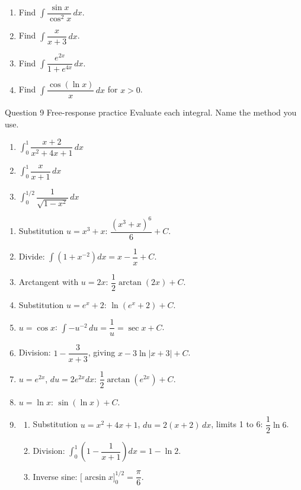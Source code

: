 \documentclass[11pt]{article}
\begin{document}
\begin{enumerate}[leftmargin=*,itemsep=2pt,start=5]
  \item Find $\displaystyle\int\dfrac{\sin x}{\cos^2x}\,dx$.\work{2.8cm}
  \item Find $\displaystyle\int\dfrac{x}{x+3}\,dx$.\work{2.8cm}
  \item Find $\displaystyle\int\dfrac{e^{2x}}{1+e^{4x}}\,dx$.\work{2.8cm}
  \item Find $\displaystyle\int\dfrac{\cos(\ln x)}{x}\,dx$ for $x>0$.\work{2.8cm}
\end{enumerate}

\begin{frbox}{Question 9 \textperiodcentered{} Free-response practice}
Evaluate each integral. Name the method you use.
\begin{enumerate}[label=(\alph*),leftmargin=*,itemsep=2pt]
  \item $\displaystyle\int_0^1\dfrac{x+2}{x^2+4x+1}\,dx$\work{2.6cm}
  \item $\displaystyle\int_0^1\dfrac{x}{x+1}\,dx$\work{2.6cm}
  \item $\displaystyle\int_0^{1/2}\dfrac{1}{\sqrt{1-x^2}}\,dx$\work{2.6cm}
\end{enumerate}
\end{frbox}

\newpage
\begin{solbox}
\begin{enumerate}[leftmargin=*,itemsep=4pt]
  \item Substitution $u=x^3+x$: $\dfrac{\left(x^3+x\right)^6}{6}+C$.
  \item Divide: $\displaystyle\int\left(1+x^{-2}\right)dx=x-\dfrac1x+C$.
  \item Arctangent with $u=2x$: $\dfrac12\arctan(2x)+C$.
  \item Substitution $u=e^{x}+2$: $\ln\!\left(e^{x}+2\right)+C$.
  \item $u=\cos x$: $\displaystyle\int-u^{-2}\,du=\dfrac1u=\sec x+C$.
  \item Division: $1-\dfrac{3}{x+3}$, giving $x-3\ln|x+3|+C$.
  \item $u=e^{2x}$, $du=2e^{2x}dx$: $\dfrac12\arctan\!\left(e^{2x}\right)+C$.
  \item $u=\ln x$: $\sin(\ln x)+C$.
  \item \begin{enumerate}[label=(\alph*),leftmargin=*,itemsep=3pt]
    \item Substitution $u=x^2+4x+1$, $du=2(x+2)\,dx$, limits 1 to 6: $\dfrac12\ln6$.
    \item Division: $\displaystyle\int_0^1\left(1-\dfrac{1}{x+1}\right)dx=1-\ln2$.
    \item Inverse sine: $\Big[\arcsin x\Big]_0^{1/2}=\dfrac\pi6$.
  \end{enumerate}
\end{enumerate}
\end{solbox}
\end{document}
